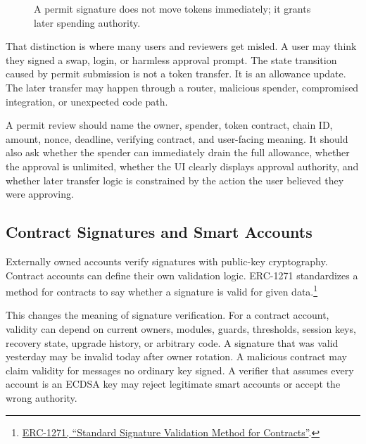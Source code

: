 \begin{figure}[htbp]
\centering
{}
\caption{A permit signature does not move tokens immediately; it grants later spending authority.}
\end{figure}

That distinction is where many users and reviewers get misled. A user may think they signed a swap, login, or harmless approval prompt. The state transition caused by permit submission is not a token transfer. It is an allowance update. The later transfer may happen through a router, malicious spender, compromised integration, or unexpected code path.

A permit review should name the owner, spender, token contract, chain ID, amount, nonce, deadline, verifying contract, and user-facing meaning. It should also ask whether the spender can immediately drain the full allowance, whether the approval is unlimited, whether the UI clearly displays approval authority, and whether later transfer logic is constrained by the action the user believed they were approving.

\subsection{Contract Signatures and Smart Accounts}

Externally owned accounts verify signatures with public-key cryptography. Contract accounts can define their own validation logic. ERC-1271 standardizes a method for contracts to say whether a signature is valid for given data.\footnote{\href{https://eips.ethereum.org/EIPS/eip-1271}{ERC-1271, ``Standard Signature Validation Method for Contracts''}.}

This changes the meaning of signature verification. For a contract account, validity can depend on current owners, modules, guards, thresholds, session keys, recovery state, upgrade history, or arbitrary code. A signature that was valid yesterday may be invalid today after owner rotation. A malicious contract may claim validity for messages no ordinary key signed. A verifier that assumes every account is an ECDSA key may reject legitimate smart accounts or accept the wrong authority.

